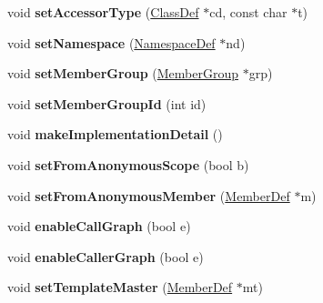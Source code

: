 \begin{DoxyCompactItemize}
\item 
\hypertarget{class_member_def_afd053b937d5e9c3aa7df5de15d2c3b5d}{void {\bfseries set\-Accessor\-Type} (\hyperlink{class_class_def}{Class\-Def} $\ast$cd, const char $\ast$t)}\label{class_member_def_afd053b937d5e9c3aa7df5de15d2c3b5d}

\item 
\hypertarget{class_member_def_a77ef7c03d7ab9059874406ccceb110e8}{void {\bfseries set\-Namespace} (\hyperlink{class_namespace_def}{Namespace\-Def} $\ast$nd)}\label{class_member_def_a77ef7c03d7ab9059874406ccceb110e8}

\item 
\hypertarget{class_member_def_a7ecbf301bd88c17e08399ffa5b9a7b98}{void {\bfseries set\-Member\-Group} (\hyperlink{class_member_group}{Member\-Group} $\ast$grp)}\label{class_member_def_a7ecbf301bd88c17e08399ffa5b9a7b98}

\item 
\hypertarget{class_member_def_a81e574cc0afb9b53fbd684d1b9efe234}{void {\bfseries set\-Member\-Group\-Id} (int id)}\label{class_member_def_a81e574cc0afb9b53fbd684d1b9efe234}

\item 
\hypertarget{class_member_def_a232954314c4a9444ceef78f28f17e29f}{void {\bfseries make\-Implementation\-Detail} ()}\label{class_member_def_a232954314c4a9444ceef78f28f17e29f}

\item 
\hypertarget{class_member_def_a051dd452c36a7c146a9bed54a3dcbf7d}{void {\bfseries set\-From\-Anonymous\-Scope} (bool b)}\label{class_member_def_a051dd452c36a7c146a9bed54a3dcbf7d}

\item 
\hypertarget{class_member_def_a6facf8cfc4022f4f13dd088382e3d863}{void {\bfseries set\-From\-Anonymous\-Member} (\hyperlink{class_member_def}{Member\-Def} $\ast$m)}\label{class_member_def_a6facf8cfc4022f4f13dd088382e3d863}

\item 
\hypertarget{class_member_def_a4ea74558274c17b18275ccde5525f320}{void {\bfseries enable\-Call\-Graph} (bool e)}\label{class_member_def_a4ea74558274c17b18275ccde5525f320}

\item 
\hypertarget{class_member_def_a2a53a513b1ef9afcff95f28e473a80d9}{void {\bfseries enable\-Caller\-Graph} (bool e)}\label{class_member_def_a2a53a513b1ef9afcff95f28e473a80d9}

\item 
\hypertarget{class_member_def_a39b4fa936910fa99550d9eccfb296659}{void {\bfseries set\-Template\-Master} (\hyperlink{class_member_def}{Member\-Def} $\ast$mt)}\label{class_member_def_a39b4fa936910fa99550d9eccfb296659}


\end{DoxyCompactItemize}
